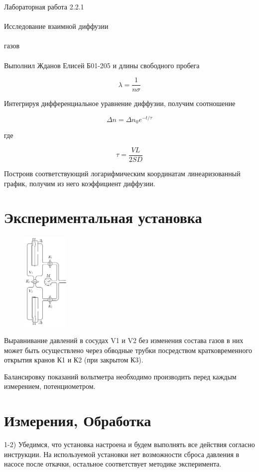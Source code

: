 \documentclass{astroedu-lab}
\begin{document}
\begin{problem}{\huge Лабораторная работа 2.2.1\\\\Исследование взаимной диффузии\\\\газов\\\\Выполнил Жданов Елисей Б01-205}
и длины свободного пробега

\begin{equation}
	\lambda = \frac{1}{n \sigma}
\end{equation}

Интегрируя дифференциальное уравнение диффузии, получим соотношение

\begin{equation}
	\Delta n = \Delta n_0 e^{-t/\tau}
\end{equation}

где

\begin{equation}
	\tau = \frac{V L}{2 S D}
\end{equation}

Построив соответствующий логарифмическим координатам линеаризованный график, получим из него коэффициент диффузии.

\section{Экспериментальная установка}

\begin{figure}[!h]
	\centering
	\includegraphics[width=0.2\textwidth]{установка.png}
	\label{fig:boiler}
\end{figure}

Выравнивание давлений в сосудах V1 и V2 без изменения состава газов в них может быть осуществлено через обводные трубки посредством кратковременного открытия кранов К1 и К2 (при закрытом К3).

Балансировку показаний вольтметра необходимо производить перед каждым измерением, потенциометром.

\section{Измерения, Обработка}

1-2) Убедимся, что установка настроена и будем выполнять все действия согласно инструкции. На используемой установки нет возможности сброса давления в насосе после откачки, остальное соответствует методике эксперимента.


\end{problem}
\end{document}
